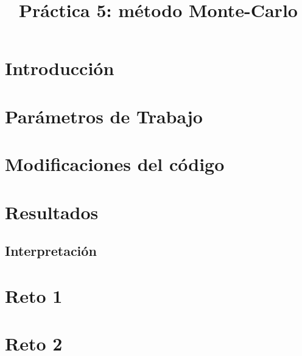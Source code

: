 \documentclass[a4paper]{article}
\title{Práctica 5: método Monte-Carlo}
\begin{document}
\maketitle

\section{Introducci\'on}

\section{Par\'ametros de Trabajo}



\section{Modificaciones del código}



\section{Resultados}


\subsection{Interpretación}

\section{Reto 1}

\section{Reto 2}
\end{document}

